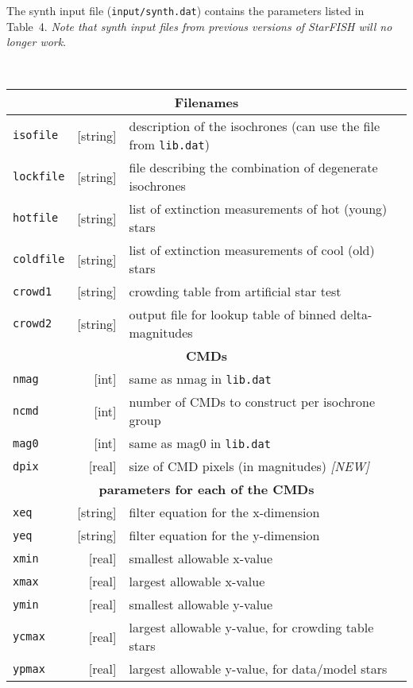 \documentclass[12pt]{book}
\def\ttg{\tt\color{DarkGreen}}
\def\tto{\tt\color{myOrange}}
\def\itr{\it\color{myRed}}
\begin{document}
\clearpage

\noindent The synth input file ({\ttg input/synth.dat}) contains the 
parameters listed in Table~4. {\itr Note that synth input files from 
previous versions of StarFISH will no longer work}.

\bigskip
{} \\
{\scriptsize
\begin{tabular}{|lr|l|}
\hline
\multicolumn{3}{|c|}{\bf Filenames} \\ 
\hline
{\tto isofile}  &[string]& description of the isochrones (can use the file from {\ttg lib.dat}) \\
{\tto lockfile} &[string]& file describing the combination of degenerate isochrones\\
{\tto hotfile}  &[string]& list of extinction measurements of hot (young) stars\\
{\tto coldfile} &[string]& list of extinction measurements of cool (old) stars\\
{\tto crowd1}   &[string]& crowding table from artificial star test\\
{\tto crowd2}   &[string]& output file for lookup table of binned delta-magnitudes \\ 
\hline
\multicolumn{3}{|c|}{\bf CMDs} \\ 
\hline
{\tto nmag} &  [int] & same as nmag in {\ttg lib.dat}\\
{\tto ncmd} &  [int] & number of CMDs to construct per isochrone group\\
{\tto mag0} &  [int] & same as mag0 in {\ttg lib.dat}\\ 
{\tto dpix} & [real] & size of CMD pixels (in magnitudes) {\itr[NEW]}\\
\hline
\multicolumn{3}{|c|}{\bf parameters for each of the CMDs} \\ 
\hline
{\tto xeq}    &[string]& filter equation for the x-dimension\\
{\tto yeq}    &[string]& filter equation for the y-dimension\\
{\tto xmin}   & [real] & smallest allowable x-value\\
{\tto xmax}   & [real] & largest allowable x-value\\
{\tto ymin}   & [real] & smallest allowable y-value\\
{\tto ycmax}  & [real] & largest allowable y-value, for crowding table stars\\
{\tto ypmax}  & [real] & largest allowable y-value, for data/model stars\\

\end{tabular}}
\end{document}
